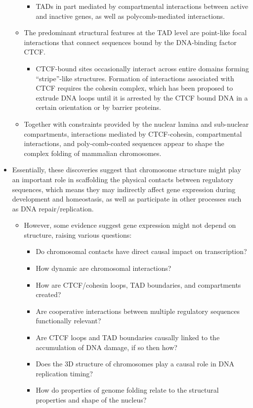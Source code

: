 \documentclass[plain,basic]{inVerba-notes}
\begin{document}
\begin{itemize}
\begin{itemize}
\begin{itemize}
                    \item TADs in part mediated by compartmental interactions between active and inactive genes, as well as polycomb-mediated interactions.
                \end{itemize}
            \item The predominant structural features at the TAD level are point-like focal interactions that connect sequences bound by the DNA-binding factor CTCF.
                \begin{itemize}
                    \item CTCF-bound sites occasionally interact across entire domains forming ``stripe''-like structures. Formation of interactions associated with CTCF requires the cohesin complex, which has been proposed to extrude DNA loops until it is arrested by the CTCF bound DNA in a certain orientation or by barrier proteins. 
                \end{itemize}
            \item Together with constraints provided by the nuclear lamina and sub-nuclear compartments, interactions mediated by CTCF-cohesin, compartmental interactions, and poly-comb-coated sequences appear to shape the complex folding of mammalian chromosomes.
        \end{itemize}
    \item Essentially, these discoveries suggest that chromosome structure might play an important role in scaffolding the physical contacts between regulatory sequences, which means they may indirectly affect gene expression during development and homeostasis, as well as participate in other processes such as DNA repair/replication.
        \begin{itemize}
            \item However, some evidence suggest gene expression might not depend on structure, raising various questions:
                \begin{itemize}
                    \item Do chromosomal contacts have direct causal impact on transcription?
                    \item How dynamic are chromosomal interactions?
                    \item How are CTCF/cohesin loops, TAD boundaries, and compartments created?
                    \item Are cooperative interactions between multiple regulatory sequences functionally relevant?
                    \item Are CTCF loops and TAD boundaries causally linked to the accumulation of DNA damage, if so then how?
                    \item Does the 3D structure of chromosomes play a causal role in DNA replication timing?
                    \item How do properties of genome folding relate to the structural properties and shape of the nucleus?
                \end{itemize}
        \end{itemize}
\end{itemize}

\nocite{mccord2020chromosome}


\end{document}
